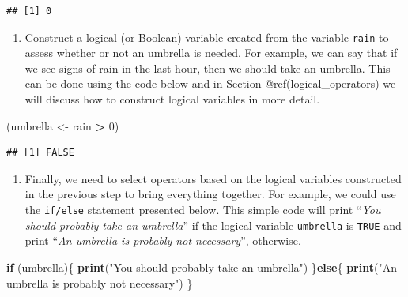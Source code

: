 \documentclass[12pt,]{krantz}
\newenvironment{Shaded}{\begin{snugshade}}{\end{snugshade}}
\newcommand{\KeywordTok}[1]{\textcolor[rgb]{0.27,0.27,0.27}{\textbf{#1}}}
\newcommand{\DecValTok}[1]{\textcolor[rgb]{0.06,0.06,0.06}{#1}}
\newcommand{\StringTok}[1]{\textcolor[rgb]{0.5,0.5,0.5}{#1}}
\newcommand{\ControlFlowTok}[1]{\textcolor[rgb]{0.27,0.27,0.27}{\textbf{#1}}}
\newcommand{\OperatorTok}[1]{\textcolor[rgb]{0.43,0.43,0.43}{\textbf{#1}}}
\newcommand{\NormalTok}[1]{#1}
\providecommand{\tightlist}{%
  \setlength{\itemsep}{0pt}\setlength{\parskip}{0pt}}
\begin{document}
\begin{verbatim}
## [1] 0
\end{verbatim}

\begin{enumerate}
\def\labelenumi{\arabic{enumi})}
\setcounter{enumi}{1}
\tightlist
\item
  Construct a logical (or Boolean) variable created from the variable
  \texttt{rain} to assess whether or not an umbrella is needed. For
  example, we can say that if we see signs of rain in the last hour,
  then we should take an umbrella. This can be done using the code below
  and in Section @ref(logical\_operators) we will discuss how to
  construct logical variables in more detail.
\end{enumerate}

\begin{Shaded}
\begin{Highlighting}[]
\NormalTok{(umbrella <-}\StringTok{ }\NormalTok{rain }\OperatorTok{>}\StringTok{ }\DecValTok{0}\NormalTok{)}
\end{Highlighting}
\end{Shaded}

\begin{verbatim}
## [1] FALSE
\end{verbatim}

\begin{enumerate}
\def\labelenumi{\arabic{enumi})}
\setcounter{enumi}{2}
\tightlist
\item
  Finally, we need to select operators based on the logical variables
  constructed in the previous step to bring everything together. For
  example, we could use the \texttt{if/else} statement presented below.
  This simple code will print ``\emph{You should probably take an
  umbrella}'' if the logical variable \texttt{umbrella} is \texttt{TRUE}
  and print ``\emph{An umbrella is probably not necessary}'', otherwise.
\end{enumerate}

\begin{Shaded}
\begin{Highlighting}[]
\ControlFlowTok{if}\NormalTok{ (umbrella)\{}
  \KeywordTok{print}\NormalTok{(}\StringTok{"You should probably take an umbrella"}\NormalTok{)}
\NormalTok{\}}\ControlFlowTok{else}\NormalTok{\{}
  \KeywordTok{print}\NormalTok{(}\StringTok{"An umbrella is probably not necessary"}\NormalTok{)}
\NormalTok{\}}
\end{Highlighting}
\end{Shaded}
\end{document}

